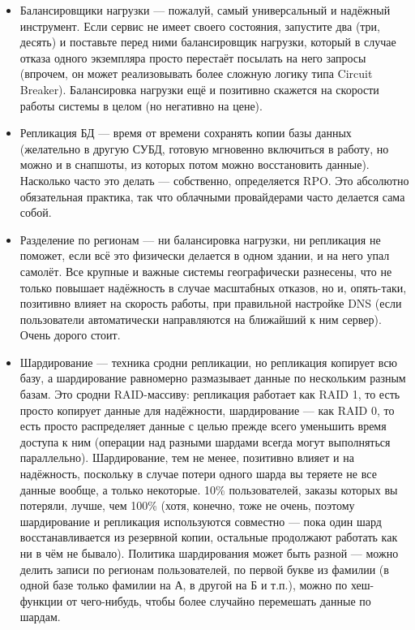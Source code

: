 \documentclass[a5paper]{article}
\begin{document}
\begin{itemize}
    \item Балансировщики нагрузки --- пожалуй, самый универсальный и надёжный инструмент. Если сервис не имеет своего состояния, запустите два (три, десять) и поставьте перед ними балансировщик нагрузки, который в случае отказа одного экземпляра просто перестаёт посылать на него запросы (впрочем, он может реализовывать более сложную логику типа Circuit Breaker). Балансировка нагрузки ещё и позитивно скажется на скорости работы системы в целом (но негативно на цене).
    \item Репликация БД --- время от времени сохранять копии базы данных (желательно в другую СУБД, готовую мгновенно включиться в работу, но можно и в снапшоты, из которых потом можно восстановить данные). Насколько часто это делать --- собственно, определяется RPO. Это абсолютно обязательная практика, так что облачными провайдерами часто делается сама собой.
    \item Разделение по регионам --- ни балансировка нагрузки, ни репликация не поможет, если всё это физически делается в одном здании, и на него упал самолёт. Все крупные и важные системы географически разнесены, что не только повышает надёжность в случае масштабных отказов, но и, опять-таки, позитивно влияет на скорость работы, при правильной настройке DNS (если пользователи автоматически направляются на ближайший к ним сервер). Очень дорого стоит.
    \item Шардирование --- техника сродни репликации, но репликация копирует всю базу, а шардирование равномерно размазывает данные по нескольким разным базам. Это сродни RAID-массиву: репликация работает как RAID 1, то есть просто копирует данные для надёжности, шардирование --- как RAID 0, то есть просто распределяет данные с целью прежде всего уменьшить время доступа к ним (операции над разными шардами всегда могут выполняться параллельно). Шардирование, тем не менее, позитивно влияет и на надёжность, поскольку в случае потери одного шарда вы теряете не все данные вообще, а только некоторые. 10\% пользователей, заказы которых вы потеряли, лучше, чем 100\% (хотя, конечно, тоже не очень, поэтому шардирование и репликация используются совместно --- пока один шард восстанавливается из резервной копии, остальные продолжают работать как ни в чём не бывало). Политика шардирования может быть разной --- можно делить записи по регионам пользователей, по первой букве из фамилии (в одной базе только фамилии на А, в другой на Б и т.п.), можно по хеш-функции от чего-нибудь, чтобы более случайно перемешать данные по шардам.
\end{itemize}
\end{document}
